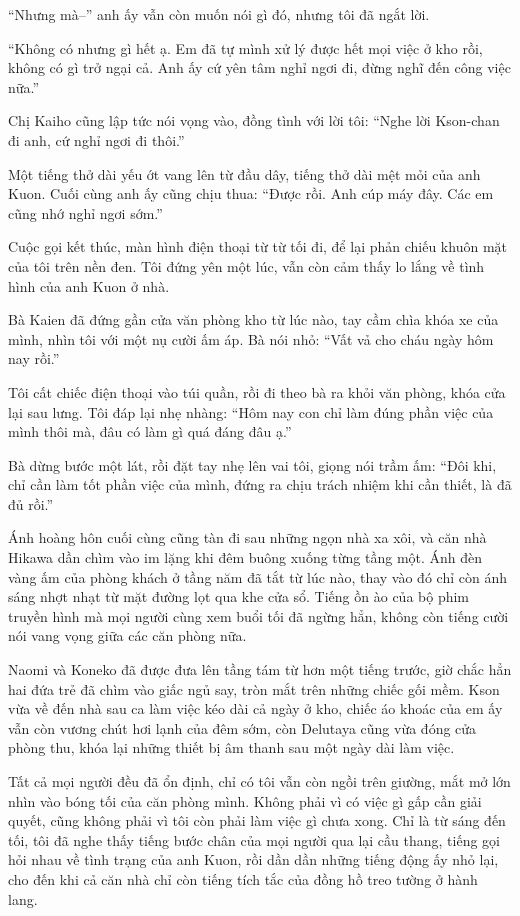 \documentclass[../main.tex]{subfiles}
\begin{document}
``Nhưng mà--'' anh ấy vẫn còn muốn nói gì đó, nhưng tôi đã ngắt lời.

``Không có nhưng gì hết ạ. Em đã tự mình xử lý được hết mọi việc ở kho rồi, không có gì trở ngại cả. Anh ấy cứ yên tâm nghỉ ngơi đi, đừng nghĩ đến công việc nữa.''

Chị Kaiho cũng lập tức nói vọng vào, đồng tình với lời tôi: ``Nghe lời Kson-chan đi anh, cứ nghỉ ngơi đi thôi.''

Một tiếng thở dài yếu ớt vang lên từ đầu dây, tiếng thở dài mệt mỏi của anh Kuon. Cuối cùng anh ấy cũng chịu thua: ``Được rồi. Anh cúp máy đây. Các em cũng nhớ nghỉ ngơi sớm.''

Cuộc gọi kết thúc, màn hình điện thoại từ từ tối đi, để lại phản chiếu khuôn mặt của tôi trên nền đen. Tôi đứng yên một lúc, vẫn còn cảm thấy lo lắng về tình hình của anh Kuon ở nhà.

Bà Kaien đã đứng gần cửa văn phòng kho từ lúc nào, tay cầm chìa khóa xe của mình, nhìn tôi với một nụ cười ấm áp. Bà nói nhỏ: ``Vất vả cho cháu ngày hôm nay rồi.''

Tôi cất chiếc điện thoại vào túi quần, rồi đi theo bà ra khỏi văn phòng, khóa cửa lại sau lưng. Tôi đáp lại nhẹ nhàng: ``Hôm nay con chỉ làm đúng phần việc của mình thôi mà, đâu có làm gì quá đáng đâu ạ.''

Bà dừng bước một lát, rồi đặt tay nhẹ lên vai tôi, giọng nói trầm ấm: ``Đôi khi, chỉ cần làm tốt phần việc của mình, đứng ra chịu trách nhiệm khi cần thiết, là đã đủ rồi.''


Ánh hoàng hôn cuối cùng cũng tàn đi sau những ngọn nhà xa xôi, và căn nhà Hikawa dần chìm vào im lặng khi đêm buông xuống từng tầng một. Ánh đèn vàng ấm của phòng khách ở tầng năm đã tắt từ lúc nào, thay vào đó chỉ còn ánh sáng nhợt nhạt từ mặt đường lọt qua khe cửa sổ. Tiếng ồn ào của bộ phim truyền hình mà mọi người cùng xem buổi tối đã ngừng hẳn, không còn tiếng cười nói vang vọng giữa các căn phòng nữa. 

Naomi và Koneko đã được đưa lên tầng tám từ hơn một tiếng trước, giờ chắc hẳn hai đứa trẻ đã chìm vào giấc ngủ say, tròn mắt trên những chiếc gối mềm. Kson vừa về đến nhà sau ca làm việc kéo dài cả ngày ở kho, chiếc áo khoác của em ấy vẫn còn vương chút hơi lạnh của đêm sớm, còn Delutaya cũng vừa đóng cửa phòng thu, khóa lại những thiết bị âm thanh sau một ngày dài làm việc.

Tất cả mọi người đều đã ổn định, chỉ có tôi vẫn còn ngồi trên giường, mắt mở lớn nhìn vào bóng tối của căn phòng mình. Không phải vì có việc gì gấp cần giải quyết, cũng không phải vì tôi còn phải làm việc gì chưa xong. Chỉ là từ sáng đến tối, tôi đã nghe thấy tiếng bước chân của mọi người qua lại cầu thang, tiếng gọi hỏi nhau về tình trạng của anh Kuon, rồi dần dần những tiếng động ấy nhỏ lại, cho đến khi cả căn nhà chỉ còn tiếng tích tắc của đồng hồ treo tường ở hành lang.
\end{document}
